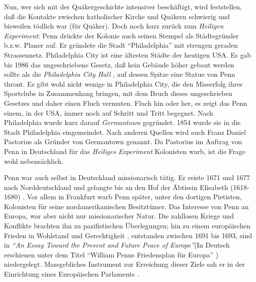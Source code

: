 
\medskip

Nun, wer sich mit der Quäkergeschichte intensiver beschäftigt, wird feststellen,
daß die Kontakte zwischen katholischer Kirche und Quäkern schwierig und
bisweilen tödlich war (für Quäker). Doch noch kurz zurück zum \textit{Heiligen
Experiment}: Penn drückte der Kolonie auch seinen Stempel als Städtegründer
b.z.w. Planer auf. Er gründete die Stadt "`Philadelphia"' mit strengen geraden
Strassennetz. Philadelphia City ist eine ältesten Städte der heutigen USA. Es gab
bis 1986 das ungeschriebene Gesetz, daß kein Gebäude höher gebaut werden sollte
als die \textit{Philadelphia City Hall} ,
auf dessen Spitze eine Statue von Penn thront. Es gibt wohl nicht wenige in
Philadelphia City, die den Misserfolg ihres Sportclubs in Zusammenhang bringen,
mit dem Bruch dieses ungeschrieben Gesetzes und daher einen Fluch vermuten. Fluch hin
oder her, es zeigt das Penn einem, in der USA, immer noch auf Schritt und Tritt
begegnet. Nach Philadelphia wurde kurz darauf  \textit{Germantown}
 gegründet. 1854 wurde sie in die Stadt Philadelphia
eingemeindet. Nach anderen Quellen wird auch Franz Daniel Pastorius als Gründer
von Germantown genannt. Da Pastorius im Auftrag von Penn in Deutschland für das
\textit{Heiliges Experiment} Kolonisten warb, ist die Frage wohl nebensächlich.


\medskip

Penn war auch selbst in Deutschland missionarisch tätig. Er reiste 1671 und 1677
nach Norddeutschland  und gelangte bis an den Hof
der Äbtissin Elisabeth (1618-1680) . Vor
allem in Frankfurt  warb Penn später, unter den dortigen
Pietisten,
Kolonisten  für seine nordamerikanischen
 Besitztümer. Das Interesse von Penn an Europa, war
aber nicht nur missionarischer Natur. Die zahllosen Kriege und Konflikte brachten
ihn zu pazifistischen 
Überlegungen; hin zu einem europäischen Frieden  in
Wohlstand  und Gerechtigkeit , entstanden
zwischen 1691 bis 1693, sind in \textit{"`An Essay Toward the Present and Future
Peace
of Europe"'}(In Deutsch erschienen unter dem Titel "`William Penns Friedensplan
für Europa"' ) niedergelegt. Massgebliches Instrument zur Erreichung dieser
Ziele sah er in der Einrichtung eines Europäischen Parlaments
.
